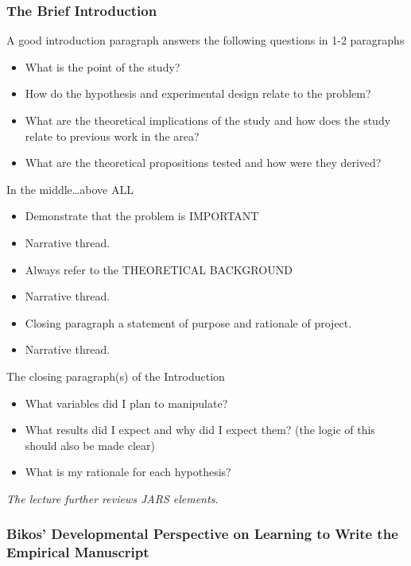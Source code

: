 \documentclass[
  english,
]{book}
\providecommand{\tightlist}{%
  \setlength{\itemsep}{0pt}\setlength{\parskip}{0pt}}
\begin{document}
\hypertarget{the-brief-introduction}{%
\subsubsection{The Brief Introduction}\label{the-brief-introduction}}

A good introduction paragraph answers the following questions in 1-2 paragraphs

\begin{itemize}
\tightlist
\item
  What is the point of the study?
\item
  How do the hypothesis and experimental design relate to the problem?
\item
  What are the theoretical implications of the study and how does the study relate to previous work in the area?
\item
  What are the theoretical propositions tested and how were they derived?
\end{itemize}

In the middle\ldots above ALL

\begin{itemize}
\tightlist
\item
  Demonstrate that the problem is IMPORTANT
\item
  Narrative thread.
\item
  Always refer to the THEORETICAL BACKGROUND
\item
  Narrative thread.
\item
  Closing paragraph a statement of purpose and rationale of project.
\item
  Narrative thread.
\end{itemize}

The closing paragraph(s) of the Introduction

\begin{itemize}
\tightlist
\item
  What variables did I plan to manipulate?
\item
  What results did I expect and why did I expect them? (the logic of this should also be made clear)
\item
  What is my rationale for each hypothesis?
\end{itemize}

\emph{The lecture further reviews JARS elements.}

\hypertarget{bikos-developmental-perspective-on-learning-to-write-the-empirical-manuscript}{%
\subsubsection{Bikos' Developmental Perspective on Learning to Write the Empirical Manuscript}\label{bikos-developmental-perspective-on-learning-to-write-the-empirical-manuscript}}
\end{document}
